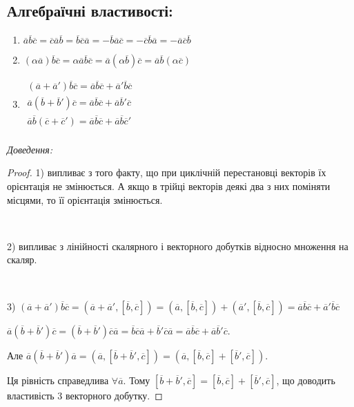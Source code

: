 \subsection*{Алгебраїчні властивості:}

\begin{enumerate}
	\item $\overline{a}\overline{b}\overline{c} = \overline{c}\overline{a}\overline{b} = \overline{b}\overline{c}\overline{a} = -\overline{b}\overline{a}\overline{c} = -\overline{c}\overline{b}\overline{a} = -\overline{a}\overline{c}\overline{b}$
	\item $(\alpha\overline{a})\overline{b}\overline{c} = \alpha\overline{a}\overline{b}\overline{c} = \overline{a}(\alpha\overline{b})\overline{c} = \overline{a}\overline{b}(\alpha\overline{c})$
	\item $\begin{array}{l}
			(\overline{a}+\overline{a}')\overline{b}\overline{c} = \overline{a}\overline{b}\overline{c} + \overline{a}'\overline{b}\overline{c}  \\
			\overline{a}(\overline{b}+\overline{b}')\overline{c} = \overline{a}\overline{b}\overline{c} + \overline{a}\overline{b}'\overline{c}  \\
			\overline{a}\overline{b}(\overline{c}+\overline{c}') = \overline{a}\overline{b}\overline{c} + \overline{a}\overline{b}\overline{c}'  \\
		\end{array}$	
\end{enumerate}

\textit{Доведення:}

\begin{proof}
	1) випливає з того факту, що при циклічній перестановці векторів їх
	орієнтація не змінюється. А якщо в трійці векторів деякі два з них поміняти
	місцями, то її орієнтація змінюється.

	~
	
	2) випливає з лінійності скалярного і векторного добутків відносно
	множення на скаляр.

	~

	3) $(\overline{a} + \overline{a}')\overline{b}\overline{c}
	= (\overline{a} + \overline{a}',[\overline{b},\overline{c}])
	= (\overline{a},[\overline{b},\overline{c}])
		+ (\overline{a}',[\overline{b},\overline{c}])
	= \overline{a}\overline{b}\overline{c} + \overline{a}'\overline{b}\overline{c}$

	$\overline{a}(\overline{b} + \overline{b}')\overline{c}
	= (\overline{b} + \overline{b}')\overline{c}\overline{a}
	= \overline{b}\overline{c}\overline{a} + \overline{b}'\overline{c}\overline{a}
	= \overline{a}\overline{b}\overline{c} + \overline{a}\overline{b}'\overline{c}.$
	
	Але $\overline{a}(\overline{b} + \overline{b}')\overline{a}
	= (\overline{a},[\overline{b} + \overline{b}',\overline{c}])
	= (\overline{a},[\overline{b}, \overline{c}] + [\overline{b}',\overline{c}]).$
	
	Ця рівність справедлива $\forall \overline{a}$. Тому $[\overline{b} + \overline{b}',\overline{c}]
	= [\overline{b},\overline{c}] + [\overline{b}',\overline{c}]$, що доводить
	властивість 3 векторного добутку.
\end{proof}

